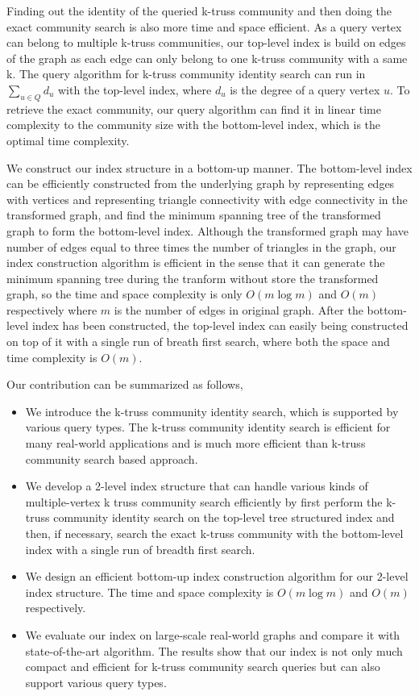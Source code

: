 Finding out the identity of the queried k-truss community and then doing the exact community search is also more time and space efficient. As a query vertex can belong to multiple k-truss communities, our top-level index is build on edges of the graph as each edge can only belong to one k-truss community with a same k. The query algorithm for k-truss community identity search can run in $\sum_{u \in Q} d_u$ with the top-level index, where $d_u$ is the degree of a query vertex $u$. To retrieve the exact community, our query algorithm can find it in linear time complexity to the community size with the bottom-level index, which is the optimal time complexity.

We construct our index structure in a bottom-up manner. The bottom-level index can be efficiently constructed from the underlying graph by representing edges with vertices and representing triangle connectivity with edge connectivity in the transformed graph, and find the minimum spanning tree of the transformed graph to form the bottom-level index. Although the transformed graph may have number of edges equal to three times the number of triangles in the graph, our index construction algorithm is efficient in the sense that it can generate the minimum spanning tree during the tranform without store the transformed graph, so the time and space complexity is only $O(m\log{m})$ and $O(m)$ respectively where $m$ is the number of edges in original graph. After the bottom-level index has been constructed, the top-level index can easily being constructed on top of it with a single run of breath first search, where both the space and time complexity is $O(m)$.

Our contribution can be summarized as follows,

\begin{itemize}
	\item We introduce the k-truss community identity search, which is supported by various query types. The k-truss community identity search is efficient for many real-world applications and is much more efficient than k-truss community search based approach.
	\item We develop a 2-level index structure that can handle various kinds of multiple-vertex k truss community search efficiently by first perform the k-truss community identity search on the top-level tree structured index and then, if necessary, search the exact k-truss community with the bottom-level index with a single run of breadth first search. 
	\item We design an efficient bottom-up index construction algorithm for our 2-level index structure. The time and space complexity is $O(m\log{m})$ and $O(m)$ respectively.
	\item We evaluate our index on large-scale real-world graphs and compare it with state-of-the-art algorithm. The results show that our index is not only much compact and efficient for k-truss community search queries but can also support various query types.
\end{itemize}

